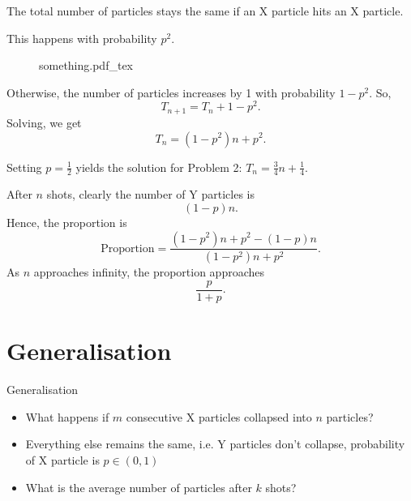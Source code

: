 \documentclass[xcolor={usenames,dvipsnames}]{beamer}
\newcommand{\incfig}[1]{%
  \def\svgwidth{0.3\textwidth}
  {#1.pdf_tex}
}
\begin{document}
\begin{frame}
  The total number of particles stays the same if an X particle hits an X particle.

  This happens with probability $p^2$.

  \begin{multicols}{2}
  \begin{figure}[ht]
    \centering
    \incfig{something}
    \label{fig:stuff}
  \end{figure}
  \columnbreak
  Otherwise, the number of particles increases by 1 with probability $1-p^2$. So, \[
    T_{n+1} = T_n + 1-p^2
  .\] Solving, we get \[
    T_n = (1-p^2)n + p^2
    .\] \end{multicols}
    Setting $p = \frac{1}{2}$ yields the solution for Problem 2: $
    T_n = \frac{3}{4}n + \frac{1}{4}
  $.
\end{frame}
\begin{frame}
  After $n$ shots, clearly the number of Y particles is \[
    (1-p)n
  .\] Hence, the proportion is 
  \begin{equation*}
    \text{Proportion} = \frac{(1-p^2)n + p^2 - (1-p)n}{(1-p^2)n + p^2}.
\end{equation*}
As $n$ approaches infinity, the proportion approaches \[
  \frac{p}{1+p}
.\] 
\end{frame}

\section{Generalisation}
\begin{frame}{Generalisation}
  \begin{itemize}
    \item What happens if $m$ consecutive X particles collapsed into $n$ particles?
    \item Everything else remains the same, i.e. Y particles don't collapse, probability of X particle is $p \in (0, 1)$
    \item What is the average number of particles after $k$ shots?
  \end{itemize}
\end{frame}
\end{document}
